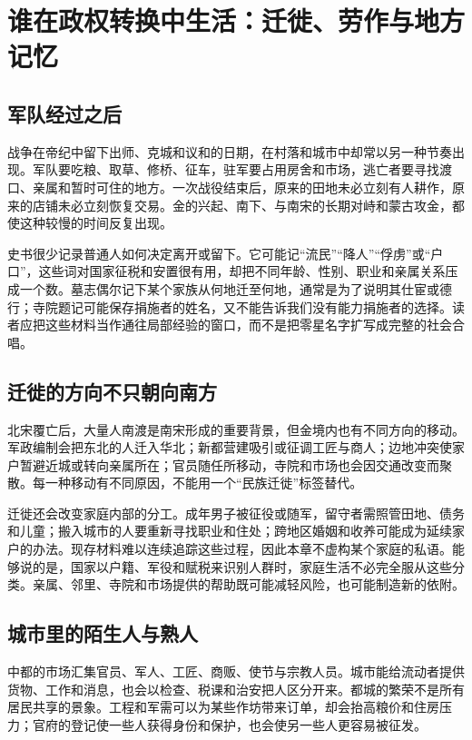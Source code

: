 \section{谁在政权转换中生活：迁徙、劳作与地方记忆}

\subsection{军队经过之后}

战争在帝纪中留下出师、克城和议和的日期，在村落和城市中却常以另一种节奏出现。军队要吃粮、取草、修桥、征车，驻军要占用房舍和市场，逃亡者要寻找渡口、亲属和暂时可住的地方。一次战役结束后，原来的田地未必立刻有人耕作，原来的店铺未必立刻恢复交易。金的兴起、南下、与南宋的长期对峙和蒙古攻金，都使这种较慢的时间反复出现。

史书很少记录普通人如何决定离开或留下。它可能记“流民”“降人”“俘虏”或“户口”，这些词对国家征税和安置很有用，却把不同年龄、性别、职业和亲属关系压成一个数。墓志偶尔记下某个家族从何地迁至何地，通常是为了说明其仕宦或德行；寺院题记可能保存捐施者的姓名，又不能告诉我们没有能力捐施者的选择。读者应把这些材料当作通往局部经验的窗口，而不是把零星名字扩写成完整的社会合唱。

\subsection{迁徙的方向不只朝向南方}

北宋覆亡后，大量人南渡是南宋形成的重要背景，但金境内也有不同方向的移动。军政编制会把东北的人迁入华北；新都营建吸引或征调工匠与商人；边地冲突使家户暂避近城或转向亲属所在；官员随任所移动，寺院和市场也会因交通改变而聚散。每一种移动有不同原因，不能用一个“民族迁徙”标签替代。

迁徙还会改变家庭内部的分工。成年男子被征役或随军，留守者需照管田地、债务和儿童；搬入城市的人要重新寻找职业和住处；跨地区婚姻和收养可能成为延续家户的办法。现存材料难以连续追踪这些过程，因此本章不虚构某个家庭的私语。能够说的是，国家以户籍、军役和赋税来识别人群时，家庭生活不必完全服从这些分类。亲属、邻里、寺院和市场提供的帮助既可能减轻风险，也可能制造新的依附。

\subsection{城市里的陌生人与熟人}

中都的市场汇集官员、军人、工匠、商贩、使节与宗教人员。城市能给流动者提供货物、工作和消息，也会以检查、税课和治安把人区分开来。都城的繁荣不是所有居民共享的景象。工程和军需可以为某些作坊带来订单，却会抬高粮价和住房压力；官府的登记使一些人获得身份和保护，也会使另一些人更容易被征发。

